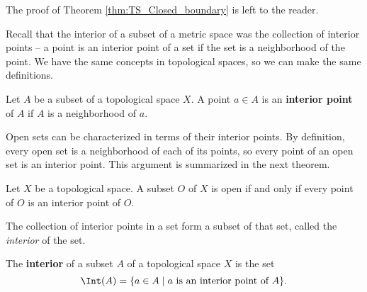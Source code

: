 The proof of Theorem \ref{thm:TS_Closed_boundary} is left to the reader.



Recall that the interior of a subset of a metric space was the collection of interior points -- a point is an interior point of a set if the set is a neighborhood of the point. We have the same concepts in topological spaces, so we can make the same definitions. 



\begin{definition} Let $A$ be a subset of a topological space $X$. A point $a \in A$ is an \textbf{interior point} of $A$ if $A$ is a neighborhood of $a$.
\end{definition}



Open sets can be characterized in terms of their interior points. By definition, every open set is a neighborhood of each of its points, so every point of an open set is an interior point. This argument is summarized in the next theorem. 



\begin{theorem} Let $X$ be a topological space. A subset $O$ of $X$ is open if and only if every point of $O$ is an interior point of $O$. 
\end{theorem}



The collection of interior points in a set form a subset of that set, called the \emph{interior} of the set.



\begin{definition} The \textbf{interior} of a subset $A$ of a topological space $X$ is the set
\[\Int(A) = \{a \in A \mid a \text{ is an interior point of } A\}.\]
\end{definition}



